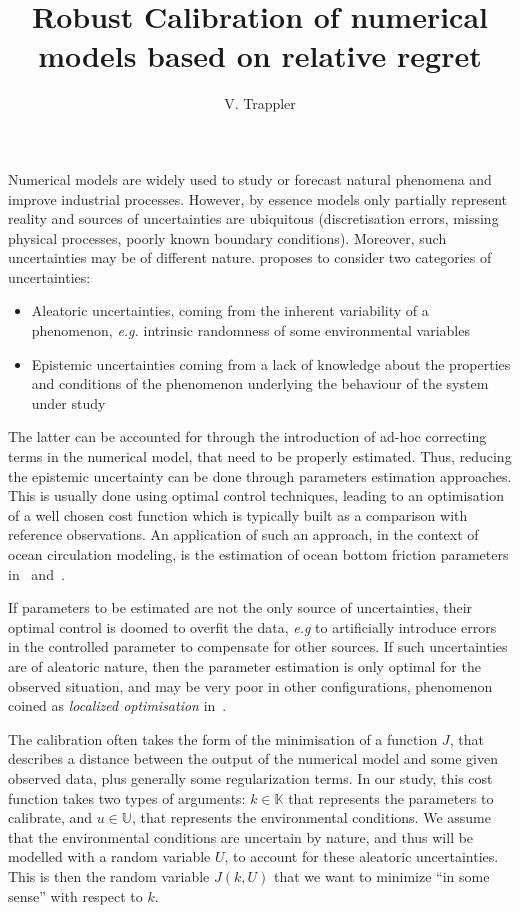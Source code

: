 \documentclass{MascotNumAbstract}
\author{V. Trappler}
\title{Robust Calibration of numerical models based on relative regret}
\begin{document}

Numerical models are widely used to study or forecast natural phenomena and improve industrial processes. However, by essence models only partially represent reality and sources of uncertainties are ubiquitous (discretisation errors, missing physical processes, poorly known boundary conditions).  Moreover, such uncertainties may be of different nature. \cite{walker_defining_2003} proposes to consider two categories of uncertainties:
\begin{itemize}
\item Aleatoric uncertainties, coming from the inherent variability of a phenomenon, \emph{e.g.} intrinsic randomness of some environmental variables
\item Epistemic uncertainties coming from a lack of knowledge about the properties and conditions of the phenomenon underlying the behaviour of the system under study
\end{itemize}
  The latter can be accounted for through the introduction of ad-hoc correcting terms in the numerical model, that need to be properly estimated. Thus, reducing the epistemic uncertainty can be done through parameters estimation approaches. This is usually done using optimal control techniques, leading to an optimisation of a well chosen cost function which is typically built as a comparison with reference observations.
%
  An application of such an approach, in the context of ocean circulation modeling, is the estimation of ocean bottom friction parameters in~\cite{das_estimation_1991} and~\cite{boutet_estimation_2015}.

  If parameters to be estimated are not the only source of uncertainties, their optimal control 
  is doomed to overfit the data, \emph{e.g} to artificially introduce errors in the controlled parameter to compensate for other sources. If such uncertainties are of aleatoric nature, then the parameter estimation is only optimal for the observed situation, and may be very poor in other configurations, phenomenon coined as \textit{localized optimisation} in~\cite{huyse_free-form_2001}.
  
  The calibration often takes the form of the minimisation of a function $J$, that describes a distance between the output of the numerical model and some given observed data, plus generally some regularization terms.
  In our study, this cost function takes two types of arguments: $k\in\mathbb{K}$ that represents the parameters to calibrate, and $u\in\mathbb{U}$, that represents the environmental conditions.
  We assume that the environmental conditions are uncertain by nature, and thus will be modelled with a random variable $U$, to account for these aleatoric uncertainties.
  This is then the random variable $J(k,U)$ that we want to minimize ``in some sense'' with respect to $k$.
\end{document}
